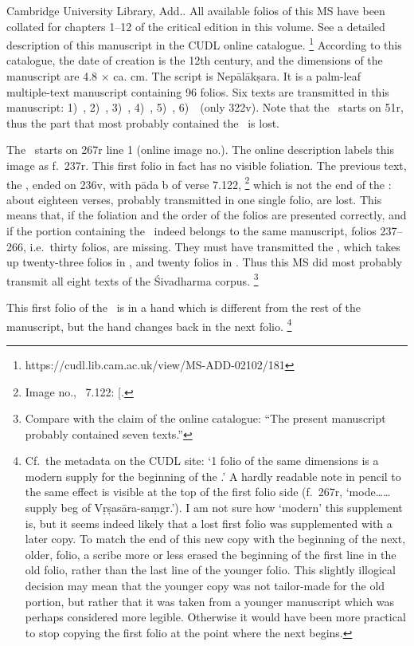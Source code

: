 Cambridge University Library, Add.. 
All available folios of this MS have been collated for 
chapters 1--12 of the critical edition in this volume. 
See a detailed description of this manuscript 
in the CUDL online catalogue.%
	\footnote{https://cudl.lib.cam.ac.uk/view/MS-ADD-02102/181}
According to this catalogue, the date of creation is the 12th
century, and the dimensions of the manuscript are 
4.8 × ca. cm. 
The script is Nepālākṣara. It is a palm-leaf multiple-text manuscript
containing 96 folios. Six texts are transmitted in this manuscript: 
1)~\SDhU,
2)~\SDhSangr,
3)~\Ums,
4)~\SivaUp,
5)~\Vss,
6)~\DharmP\ (only \fol322v). 
Note that the \SDhU\ starts on \fol51r, thus the part that most probably contained the \SDhS\ is lost.

The \Vss\ starts on \fol267r line 1 
(online image no.). 
The online description labels this image as f.~237r. 
This first folio in fact has no visible foliation.
The previous text, the \SivaUp,
ended on \fol236v, with pāda b of verse 7.122,%
 		\footnote{Image no., 
                  \SivaUp\ 7.122: 
                  {[}\skt{prāsā}{]}.}
which is not the end of the \SivaUp: 
about eighteen verses, probably transmitted in one single folio, are lost.
This means that, if the foliation and the order of the folios
are presented correctly, and if the portion containing
the \VSS\ indeed belongs to the same manuscript, 
folios 237--266, i.e.\ thirty folios, are missing. 
They must have transmitted the 
\Uums, 
which takes up twenty-three folios in \msCa, and twenty folios in \msCb.
Thus this MS did most probably transmit all eight texts of the
Śivadharma corpus.%
	\footnote{Compare with the claim of the online catalogue:
		``The present manuscript probably contained seven texts.''}	

This first folio of the \VSS\ is in a hand which is different from the
rest of the manuscript, but the hand changes back in the next folio.%
	\footnote{Cf.~the metadata on the CUDL site: 
	`1 folio of the same dimensions is a modern supply for the 
	beginning of the .' A hardly readable 
	note in pencil to the same effect is visible at the
    top of the first folio side (f.~267r, `mode\ldots{}\ldots{} supply beg
    of Vṛṣasāra-saṃgr.'). I am not sure how `modern' this supplement is,
   but it seems indeed likely that a lost first folio was supplemented
   with a later copy. To match the end of this new copy with the
   beginning of the next, older, folio, a scribe more or less erased the
   beginning of the first line in the old folio, rather than the last line
   of the younger folio. This slightly illogical decision may mean that the younger
   copy was not tailor-made for the old portion, but rather that it was
   taken from a younger manuscript which was perhaps considered more
   legible. Otherwise it would have been more practical to stop copying
   the first folio at the point where the next begins.}

